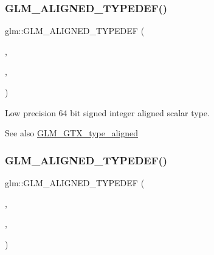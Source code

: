 \subsubsection{\texorpdfstring{G\+L\+M\+\_\+\+A\+L\+I\+G\+N\+E\+D\+\_\+\+T\+Y\+P\+E\+D\+E\+F()}{GLM\_ALIGNED\_TYPEDEF()}\hspace{0.1cm}{\footnotesize\ttfamily [4/209]}}
{\footnotesize\ttfamily glm\+::\+G\+L\+M\+\_\+\+A\+L\+I\+G\+N\+E\+D\+\_\+\+T\+Y\+P\+E\+D\+EF (\begin{DoxyParamCaption}\item[{\hyperlink{group__gtc__type__precision_gab8a8e75af347592406e41b3ae2c0712b}{lowp\+\_\+int64}}]{,  }\item[{aligned\+\_\+lowp\+\_\+int64}]{,  }\item[{8}]{ }\end{DoxyParamCaption})}

Low precision 64 bit signed integer aligned scalar type. \begin{DoxySeeAlso}{See also}
\hyperlink{group__gtx__type__aligned}{G\+L\+M\+\_\+\+G\+T\+X\+\_\+type\+\_\+aligned} 
\end{DoxySeeAlso}
\mbox{\label{group__gtx__type__aligned_ga7ddc1848ff2223026db8968ce0c97497}} 
\subsubsection{\texorpdfstring{G\+L\+M\+\_\+\+A\+L\+I\+G\+N\+E\+D\+\_\+\+T\+Y\+P\+E\+D\+E\+F()}{GLM\_ALIGNED\_TYPEDEF()}\hspace{0.1cm}{\footnotesize\ttfamily [5/209]}}
{\footnotesize\ttfamily glm\+::\+G\+L\+M\+\_\+\+A\+L\+I\+G\+N\+E\+D\+\_\+\+T\+Y\+P\+E\+D\+EF (\begin{DoxyParamCaption}\item[{\hyperlink{group__gtc__type__precision_gae6092311f6970a305c2df19a372360a3}{lowp\+\_\+int8\+\_\+t}}]{,  }\item[{aligned\+\_\+lowp\+\_\+int8\+\_\+t}]{,  }\item[{1}]{ }\end{DoxyParamCaption})}

